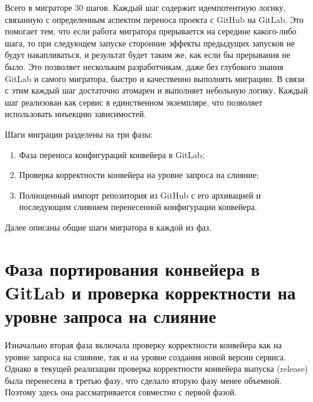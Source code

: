 Всего в миграторе 30 шагов. Каждый шаг содержит идемпотентную логику, связанную с определенным аспектом переноса проекта с GitHub на GitLab. Это помогает тем, что если работа мигратора прерывается на середине какого-либо шага, то при следующем запуске сторонние эффекты предыдущих запусков не будут накапливаться, и результат будет таким же, как если бы прерывания не было. Это позволяет нескольким разработчикам, даже без глубокого знания GitLab и самого мигратора, быстро и качественно выполнять миграцию. В связи с этим каждый шаг достаточно атомарен и выполняет небольную логику. Каждый шаг реализован как сервис в единственном экземпляре, что позволяет использовать инъекцию зависимостей.

Шаги миграции разделены на три фазы:
\begin{enumerate}
  \item Фаза переноса конфигураций конвейера в GitLab;
  \item Проверка корректности конвейера на уровне запроса на слияние;
  \item Полноценный импорт репозитория из GitHub с его архивацией и последующим слиянием перенесенной конфигурации конвейера.
\end{enumerate}

Далее описаны общие шаги мигратора в каждой из фаз.

\section{Фаза портирования конвейера в GitLab и проверка корректности на уровне запроса на слияние}
Изначально вторая фаза включала проверку корректности конвейера как на уровне запроса на слияние, так и на уровне создания новой версии сервиса. Однако в текущей реализации проверка корректности конвейера выпуска (release) была перенесена в третью фазу, что сделало вторую фазу менее объемной. Поэтому здесь она рассматривается совместно с первой фазой.

